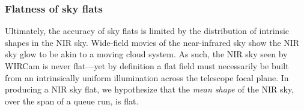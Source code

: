 \documentclass[iop]{emulateapj}
\begin{document}
\subsubsection{Flatness of sky flats}
\label{sec:skyflatshapes}




Ultimately, the accuracy of sky flats is limited by the distribution of intrinsic shapes in the NIR sky. Wide-field movies of the near-infrared sky \citep{Adams:1996} show the NIR sky glow to be akin to a moving cloud system. As such, the NIR sky seen by WIRCam is never flat---yet by definition a flat field must necessarily be built from an intrinsically uniform illumination across the telescope focal plane. In producing a NIR sky flat, we hypothesize that the \emph{mean shape} of the NIR sky, over the span of a queue run, is flat.
\end{document}
